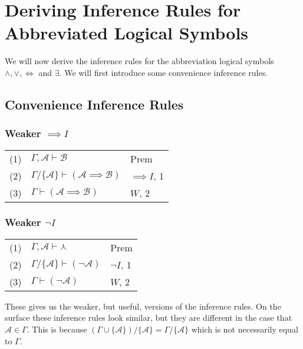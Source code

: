 \documentclass[12pt]{article}
\newcommand{\mc}[1]{\mathcal{#1}}
\begin{document}
\newpage

\section{Deriving Inference Rules for Abbreviated Logical Symbols}

We will now derive the inference rules for the abbreviation logical symbols $\land, \lor, \iff$ and $\exists$.
We will first introduce some convenience inference rules.

\subsection{Convenience Inference Rules}

\subsubsection*{Weaker $\implies I$}

\begin{center}
\begin{tabular}{ p{1cm} p{6cm} p{2cm} }
(1) & $\Gamma, \mc{A} \vdash \mc{B}$ & Prem\\
(2) & $\Gamma/\{\mc{A}\} \vdash (\mc{A} \implies \mc{B})$ & $\implies I$, 1\\
(3) & $\Gamma \vdash (\mc{A} \implies \mc{B})$ & $W$, 2
\end{tabular}
\end{center}

\subsubsection*{Weaker $\lnot I$}

\begin{center}
\begin{tabular}{ p{1cm} p{6cm} p{2cm} }
(1) & $\Gamma, \mc{A} \vdash \curlywedge$ & Prem\\
(2) & $\Gamma/\{\mc{A}\} \vdash (\lnot \mc{A})$ & $\lnot I$, 1\\
(3) & $\Gamma \vdash (\lnot \mc{A})$ & $W$, 2
\end{tabular}
\end{center}

These gives us the weaker, but useful, versions of the inference rules.
On the surface these inference rules look similar, but they are different in the case that $\mc{A} \in \Gamma$.
This is because $(\Gamma \cup \{\mc{A}\})/\{\mc{A}\} = \Gamma / \{\mc{A}\}$ which is not necessarily equal to $\Gamma$.
\end{document}
